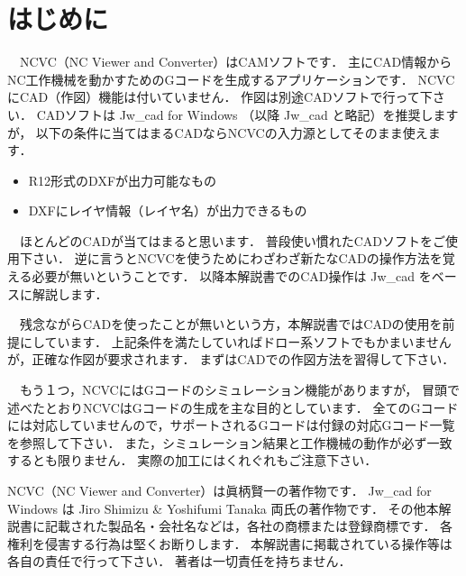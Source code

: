 
\section{はじめに}
　NCVC（NC Viewer and Converter）はCAMソフトです．
主にCAD情報からNC工作機械を動かすためのGコードを生成するアプリケーションです．
NCVCにCAD（作図）機能は付いていません．
作図は別途CADソフトで行って下さい．
CADソフトは Jw\_cad for Windows （以降 Jw\_cad と略記）を推奨しますが，
以下の条件に当てはまるCADならNCVCの入力源としてそのまま使えます．

\begin{itemize}
    \item R12形式のDXFが出力可能なもの
    \item DXFにレイヤ情報（レイヤ名）が出力できるもの
\end{itemize}

　ほとんどのCADが当てはまると思います．
普段使い慣れたCADソフトをご使用下さい．
逆に言うとNCVCを使うためにわざわざ新たなCADの操作方法を覚える必要が無いということです．
以降本解説書でのCAD操作は Jw\_cad をベースに解説します．

　残念ながらCADを使ったことが無いという方，本解説書ではCADの使用を前提にしています．
上記条件を満たしていればドロー系ソフトでもかまいませんが，正確な作図が要求されます．
まずはCADでの作図方法を習得して下さい．

　もう１つ，NCVCにはGコードのシミュレーション機能がありますが，
冒頭で述べたとおりNCVCはGコードの生成を主な目的としています．
全てのGコードには対応していませんので，サポートされるGコードは付録の対応Gコード一覧を参照して下さい．
また，シミュレーション結果と工作機械の動作が必ず一致するとも限りません．
実際の加工にはくれぐれもご注意下さい．

\vspace*{2zh}
\begin{center}
\begin{minipage}{10cm}
\begin{screen}
NCVC（NC Viewer and Converter）は眞柄賢一の著作物です．
Jw\_cad for Windows は Jiro Shimizu \& Yoshifumi Tanaka 両氏の著作物です．
その他本解説書に記載された製品名・会社名などは，各社の商標または登録商標です．
各権利を侵害する行為は堅くお断りします．
本解説書に掲載されている操作等は各自の責任で行って下さい．
著者は一切責任を持ちません．  
\end{screen}
\end{minipage}
\end{center}
